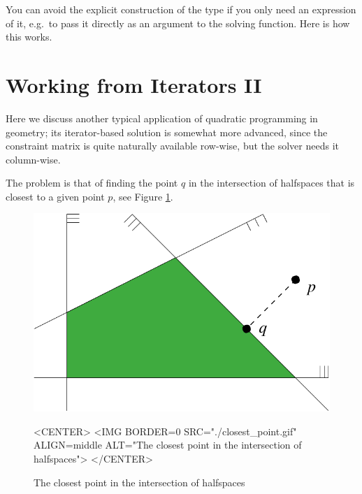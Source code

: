 You can avoid the explicit construction of the type
if you only need an expression of it, e.g.\ to pass it directly 
as an argument to the solving function. Here is how this works.


\section{Working from Iterators II}\label{sec:QP-working_from_iteratorsII}
Here we discuss another typical application of quadratic programming
in geometry; its iterator-based solution is somewhat more advanced,
since the constraint matrix is quite naturally available row-wise, 
but the solver needs it column-wise.

The problem is that of finding the point $q$
in the intersection of halfspaces that is closest to a given point $p$, 
see Figure \ref{fig:QP-closest_point}. 

\begin{figure}[htbp]
\begin{ccTexOnly}
\begin{center}
\includegraphics{QP_solver/closest_point} 
\end{center}
\end{ccTexOnly}


\begin{ccHtmlOnly}
<CENTER>
<IMG BORDER=0 SRC="./closest_point.gif" ALIGN=middle ALT="The closest point in the intersection of halfspaces">
</CENTER>
\end{ccHtmlOnly}

\caption{The closest point in the intersection of halfspaces
\label{fig:QP-closest_point}}
\end{figure}

